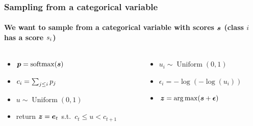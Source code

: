 \begin{frame}%
\frametitle{Sampling from a categorical variable}%
\framesubtitle{\small We want to sample from a categorical variable
    with scores $\s$ (class $i$ has a score $\ss_{i}$)}
\begin{columns}[t]%
\begin{column}{.5\textwidth}%
\centering%
\begin{itemize}
    \item<3-> $\p = \softmax(\s)$
    \item<4-> $c_{i} = \sum_{j \leq i} \pp_{j}$
    \item<5-> $u \sim \operatorname{Uniform}(0, 1)$
    \item<6-> return $\z = \bs{e}_t$ s.t.\ $c_{t} \leq u < c_{t+1}$
\end{itemize}
\end{column}
\begin{column}{.5\textwidth}%
\centering%
\begin{itemize}
    \item<8-> $u_i \sim \operatorname{Uniform}(0, 1)$
    \item<9-> $\epsilon_{i} = -\log(-\log(u_i))$
    \item<10-> $\z = \argmax(\s + \bs{\epsilon})$
\end{itemize}
\end{column}
\end{columns}
\vspace{\baselineskip}
\centering
{}
\end{frame}



